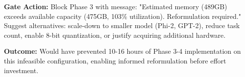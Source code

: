 \textbf{Gate Action:}
Block Phase 3 with message: "Estimated memory (489GB) exceeds available capacity (475GB, 103\% utilization). Reformulation required." Suggest alternatives: scale-down to smaller model (Phi-2, GPT-2), reduce task count, enable 8-bit quantization, or justify acquiring additional hardware.

\textbf{Outcome:} Would have prevented 10-16 hours of Phase 3-4 implementation on this infeasible configuration, enabling informed reformulation before effort investment.
